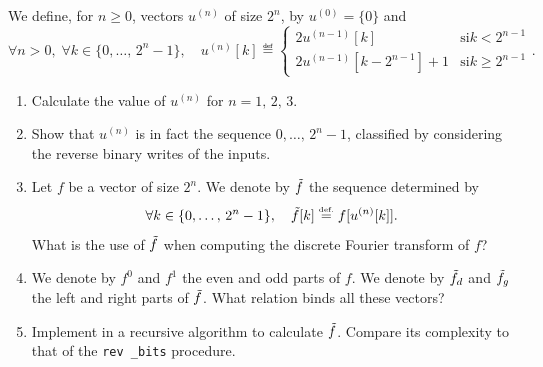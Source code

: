 \begin{exo}
\label{exo-bit-reversal}
 
 We define, for $ n \geq 0 $, vectors $ u^{(n)} $ of size $ 2^n $, by $ u^{(0)} = \{0\} $ and
\begin{equation*}
\forall n> 0, \; \forall k \in \{0, \ldots, \, 2^n-1\}, \quad u^{(n)}[k] \eqdef \left\{\begin{array}{ll} 2 u^{(n-1)}[k] & \text{si} k <2^{n-1} \\2 u^{(n-1)}[k-2^{n-1}] + 1 & \text{si} k \geq 2^{n-1} \end{array} \right. .
\end{equation*}
\begin{enumerate}
\item Calculate the value of $ u^{(n)} $ for $ n = 1, \, 2, \, 3 $.
\item Show that $ u^{(n)} $ is in fact the sequence $ 0, \ldots, \, 2^n-1 $, classified by considering the reverse binary writes of the inputs.
\item Let $ f $ be a vector of size $ 2^n $. We denote by $ \tilde{f} $ the sequence determined by
\begin{equation*}
\forall k \in \{0, \ldots, \, 2^n-1\}, \quad \tilde{f}[k] \stackrel{\mbox{\upshape\tiny def.}}{=} f[u^{(n)}[k]].
\end{equation*}
What is the use of $ \tilde{f} $ when computing the discrete Fourier transform of $ f $?
\item We denote by $ f^0 $ and $ f^1 $ the even and odd parts of $ f $. We denote by $ \tilde{f}_d $ and $ \tilde{f}_g $ the left and right parts of $ \tilde{f} $. What relation binds all these vectors?
\item {}  Implement in \Matlab{} a recursive algorithm to calculate $ \tilde{f} $. Compare its complexity to that of the \texttt{\upshape rev \_bits} procedure.
\end{enumerate}
\end{exo}
 
